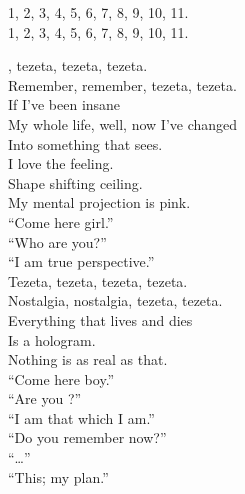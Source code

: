 


1, 2, 3, 4, 5, 6, 7, 8, 9, 10, 11. \\
1, 2, 3, 4, 5, 6, 7, 8, 9, 10, 11. \\




, tezeta, tezeta, tezeta. \\
Remember, remember, tezeta, tezeta. \\

If I've been insane \\
My whole life, well, now I've changed \\
Into something that sees. \\
I love the feeling. \\
Shape shifting ceiling. \\
My mental projection is pink. \\

``Come here girl.'' \\
``Who are you?'' \\
``I am true perspective.'' \\

Tezeta, tezeta, tezeta, tezeta. \\
Nostalgia, nostalgia, tezeta, tezeta. \\

Everything that lives and dies \\
Is a hologram. \\
Nothing is as real as that. \\
``Come here boy.'' \\
``Are you ?'' \\
``I am that which I am.'' \\

``Do you remember now?'' \\
``…'' \\
``This; my  plan.'' \\



